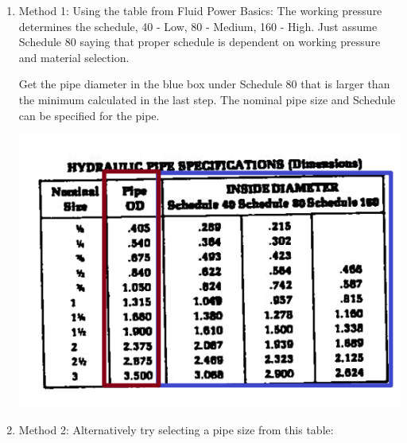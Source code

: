 \documentclass[11pt, fleqn]{article}
\begin{document}
\begin{enumerate}
\item Method 1: 
Using the table from Fluid Power Basics:  The working pressure determines the schedule, 40 - Low, 80 - Medium, 160 - High.  Just assume Schedule 80 saying that proper schedule is dependent on working pressure and material selection.

Get the pipe diameter in the blue box under Schedule 80 that is larger than the minimum calculated in the last step.  The nominal pipe size and Schedule can be specified for the pipe.

\includegraphics[scale=1]{Fluids/pipeSize.png}\\

\item Method 2:
Alternatively try selecting a pipe size from this table:
    

\end{enumerate}
\end{document}
